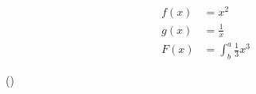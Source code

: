 \documentclass{article}
\begin{document}
\begin{align*}
  f(x) &= x^2\\
  g(x) &= \frac{1}{x}\\
  F(x) &= \int^a_b \frac{1}{3}x^3
\end{align*}


\left[
\begin{matrix}
1 & 0\\
0 & 1
\end{matrix}
\right]

\left(\right)
\end{document}
